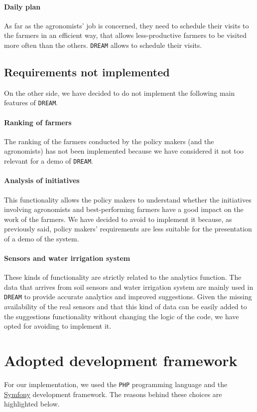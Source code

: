 \documentclass{article}
\begin{document}
\paragraph{Daily plan}
As far as the agronomists' job is concerned, they need to schedule their visits to the farmers in an efficient way, that allows less-productive farmers to be visited more often than the others. \verb|DREAM| allows to schedule their visits.
\subsection{Requirements not implemented}
On the other side, we have decided to do not implement the following main features of \verb|DREAM|.
\paragraph{Ranking of farmers}
The ranking of the farmers conducted by the policy makers (and the agronomists) has not been implemented because we have considered it not too relevant for a demo of \verb|DREAM|.
\paragraph{Analysis of initiatives}
This functionality allows the policy makers to understand whether the initiatives involving
agronomists and best-performing farmers have a good impact on the work of the farmers. We have decided to avoid to implement it because, as previously said, policy makers' requirements are less suitable for the presentation of a demo of the system.
\paragraph{Sensors and water irrigation system}
These kinds of functionality are strictly related to the analytics function. The data that arrives from soil sensors and water irrigation system are mainly used in \verb|DREAM| to provide accurate analytics and improved suggestions. Given the missing availability of the real sensors and that this kind of data can be easily added to the suggestions functionality without changing the logic of the code, we have opted for avoiding to implement it.
\newpage
\section{Adopted development framework}
For our implementation, we used the \verb|PHP| programming language and the \href{https://symfony.com/}{Symfony} development framework. The reasons behind these choices are highlighted below.
\end{document}
